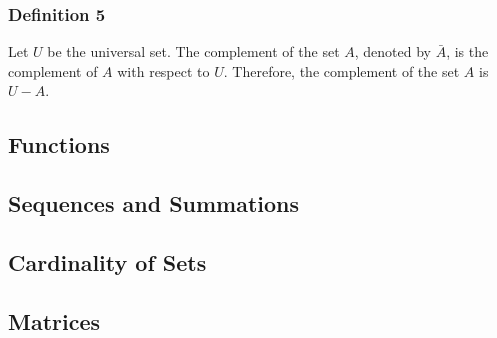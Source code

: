 \documentclass{article}
\begin{document}
\subsubsection{Definition 5}

Let $ U $ be the universal set. The complement of the set $ A $, denoted by $ \bar{A} $, is the complement of $ A $ with respect to $ U $. Therefore, the complement of the set $ A $ is $ U - A $.

\subsection{Functions}

\subsection{Sequences and Summations}

\subsection{Cardinality of Sets}

\subsection{Matrices}
\end{document}
